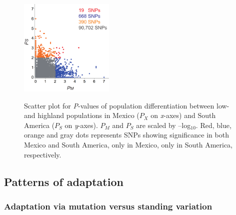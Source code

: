 \begin{figure}[tb]   
  \begin{center}
   \vspace{-0mm}
   \includegraphics[width=0.4\textwidth]{fig/Fig6}
   \renewcommand{\baselinestretch}{0.9}
   \vspace{-3mm}
   \caption{Scatter plot for \emph{P}-values of population differentiation between low- and highland populations in Mexico ($P_X$ on \emph{x}-axes) and South America ($P_S$ on \emph{y}-axes).  $P_M$ and $P_S$ are scaled by --log$_{10}$.  Red, blue, orange and gray dots represents SNPs showing significance in both Mexico and South America, only in Mexico, only in South America, respectively.} 
\vspace{-6mm}
    \label{PvDist}
  \end{center}
\end{figure}
%

\subsection*{Patterns of adaptation}

\subsubsection{Adaptation via mutation versus standing variation}

